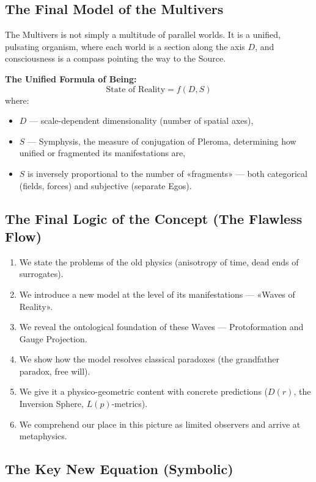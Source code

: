 \documentclass[a4paper,12pt]{article}
\begin{document}
	\subsection{The Final Model of the Multivers}
	
	The Multivers is not simply a multitude of parallel worlds. It is a unified, pulsating organism, where each world is a section along the axis $D$, and consciousness is a compass pointing the way to the Source.
	
	\textbf{The Unified Formula of Being:}
	\[
	\text{State of Reality} = f(D, S)
	\]
	where:
	\begin{itemize}
		\item $D$ — scale-dependent dimensionality (number of spatial axes),
		\item $S$ — Symphysis, the measure of conjugation of Pleroma, determining how unified or fragmented its manifestations are,
		\item $S$ is inversely proportional to the number of «fragments» — both categorical (fields, forces) and subjective (separate Egos).
	\end{itemize}
	
	\subsection{The Final Logic of the Concept (The Flawless Flow)}
	
	\begin{enumerate}
		\item We state the problems of the old physics (anisotropy of time, dead ends of surrogates).
		\item We introduce a new model at the level of its manifestations — «Waves of Reality».
		\item We reveal the ontological foundation of these Waves — Protoformation and Gauge Projection.
		\item We show how the model resolves classical paradoxes (the grandfather paradox, free will).
		\item We give it a physico-geometric content with concrete predictions ($D(r)$, the Inversion Sphere, $L(p)$-metrics).
		\item We comprehend our place in this picture as limited observers and arrive at metaphysics.
	\end{enumerate}
	
	\subsection{The Key New Equation (Symbolic)}
	
\end{document}
